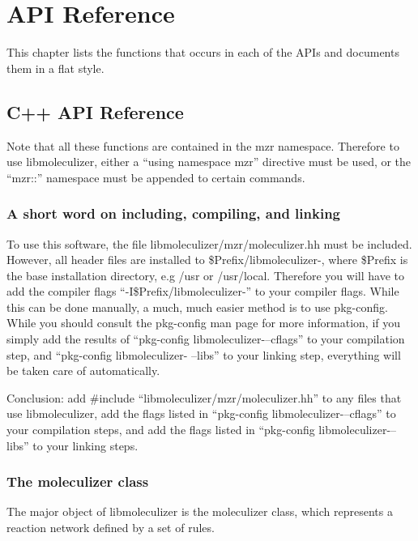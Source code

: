 \chapter {API Reference}
\label{chap:apiReference}

This chapter lists the functions that occurs in each of the APIs and
documents them in a flat style.

\section{C++ API Reference}

Note that all these functions are contained in the mzr namespace.
Therefore to use libmoleculizer, either a ``using namespace mzr''
directive must be used, or the ``mzr::'' namespace must be appended to
certain commands.  

\subsection{A short word on including, compiling, and linking}
To use this software, the file libmoleculizer/mzr/moleculizer.hh must
be included.  However, all header files are installed to
\${Prefix}/libmoleculizer-\currentversion, where \${Prefix} is the
base installation directory, e.g /usr or /usr/local.  Therefore you will have to
add the compiler flags ``-I\${Prefix}/libmoleculizer-\currentversion''
to your compiler flags.  While this can be done manually, a much, much
easier method is to use pkg-config.  While you should consult the
pkg-config man page for more information, if you simply add the
results of ``pkg-config libmoleculizer-\currentversion --cflags'' to
your compilation step, and ``pkg-config libmoleculizer-\currentversion
--libs'' to your linking step, everything will be taken care of
automatically.  


Conclusion: add \#include ``libmoleculizer/mzr/moleculizer.hh'' to any
files that use libmoleculizer, add the flags listed in ``pkg-config
libmoleculizer-\currentversion --cflags'' to your compilation steps,
and add the flags listed in ``pkg-config
libmoleculizer-\currentversion --libs'' to your linking steps.  

\subsection{The moleculizer class}
The major object of libmoleculizer is the moleculizer class, which
represents a reaction network defined by a set of rules.  

